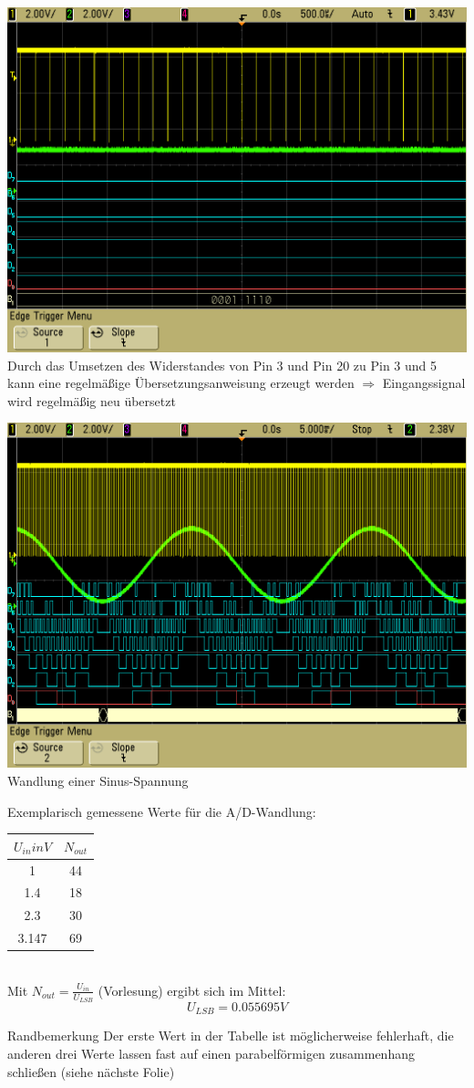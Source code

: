 \documentclass[compress,11pt]{beamer}
\begin{document}
\begin{frame}
\includegraphics[width=.7\textwidth]{../vales_zeug/scope_114}\\
Durch das Umsetzen des Widerstandes von Pin 3 und Pin 20 zu Pin 3 und 5 kann eine regelmäßige Übersetzungsanweisung erzeugt werden $\Rightarrow$  Eingangssignal wird regelmäßig neu übersetzt
\end{frame}
\begin{frame}
\includegraphics[width=.7\textwidth]{../vales_zeug/scope_115}\\
Wandlung einer Sinus-Spannung
\end{frame}
\begin{frame}
Exemplarisch gemessene Werte für die A/D-Wandlung:
\begin{tabular}{|c|c|}
\hline
$U_{in} in V$ & $N_{out}$  \\
\hline
1	&	44 \\
1.4 &	18 \\
2.3	&   30 \\
3.147	&	69 \\
\hline
\end{tabular}\\
Mit $N_{out} = \frac{U_{in}}{U_{LSB}}$ (Vorlesung) ergibt sich im Mittel: 
\begin{equation}
U_{LSB} = 0.055695 V
\end{equation}
\begin{block}{Randbemerkung}
Der erste Wert in der Tabelle ist möglicherweise fehlerhaft, die anderen drei Werte lassen fast auf einen parabelförmigen zusammenhang schließen (siehe nächste Folie)
\end{block}
\end{frame}
\end{document}
